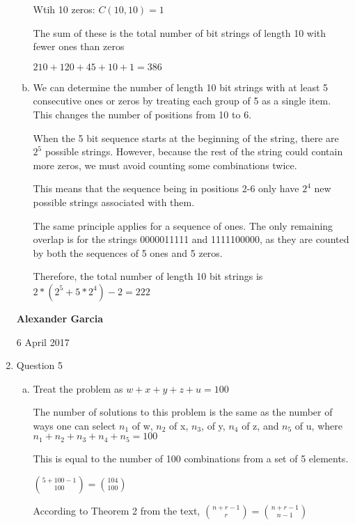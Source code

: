 \documentclass[11pt]{article}
\begin{document}
\begin{enumerate}
\begin{enumerate}[(a)]
				Wtih 10 zeros:
				$C(10, 10) = 1$

				The sum of these is the total number of bit strings of
				length 10 with fewer ones than zeros

				$210+120+45+10+1 = 386$ \\

			\item We can determine the number of length 10 bit strings with
				at least 5 consecutive ones or zeros by treating each group of 5
				as a single item. This changes the number of positions from
				10 to 6.

				When the 5 bit sequence starts at the beginning of the string, there
				are $2^5$ possible strings. However, because the rest of the string
				could contain more zeros, we must avoid counting some combinations twice.

				This means that the sequence being in positions 2-6 only have $2^4$ new
				possible strings associated with them.

				The same principle applies for a sequence of ones. The only remaining overlap
				is for the strings 0000011111 and 1111100000, as they are counted by both
				the sequences of 5 ones and 5 zeros.

				Therefore, the total number of length 10 bit strings is
				$2*(2^5 + 5*2^4) - 2 = 222$

		\end{enumerate}

		\newpage

		\textbf{Alexander Garcia}

		6 April 2017 \\

	\item Question 5

		\begin{enumerate}[(a)]

			\item Treat the problem as $w+x+y+z+u = 100$

				The number of solutions to this problem is
				the same as the number of ways one can select
				$n_1$ of w, $n_2$ of x, $n_3$, of y, $n_4$ of z,
				and $n_5$ of u, where $n_1+n_2+n_3+n_4+n_5 = 100$

				This is equal to the number of 100 combinations from
				a set of 5 elements.

				$\binom{5+100-1}{100} = \binom{104}{100}$

				According to Theorem 2 from the text, $\binom{n+r-1}{r}=
				\binom{n+r-1}{n-1}$


\end{enumerate}
\end{enumerate}
\end{document}
